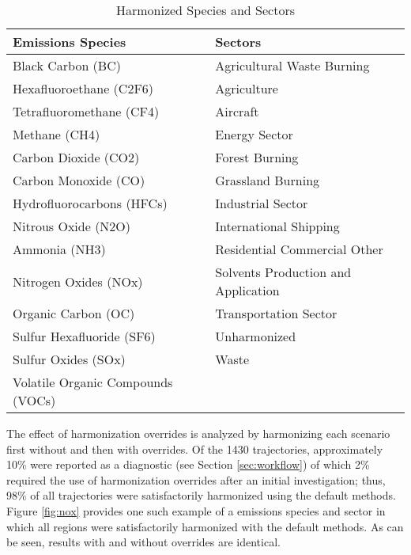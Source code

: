 \begin{table}[]
  \centering
  \caption{Harmonized Species and Sectors}
  \label{tab:sp}
  \begin{tabular}{|l|l|}
    \hline
    \textbf{Emissions Species}        & \textbf{Sectors}                    \\
    \hline
    Black Carbon (BC)                 & Agricultural Waste Burning          \\
    Hexafluoroethane (C2F6)           & Agriculture                         \\
    Tetrafluoromethane (CF4)          & Aircraft                            \\
    Methane (CH4)                     & Energy Sector                       \\
    Carbon Dioxide (CO2)              & Forest Burning                      \\
    Carbon Monoxide (CO)              & Grassland Burning                   \\
    Hydrofluorocarbons (HFCs)         & Industrial Sector                   \\
    Nitrous Oxide (N2O)               & International Shipping              \\
    Ammonia (NH3)                     & Residential Commercial Other        \\
    Nitrogen Oxides (NOx)             & Solvents Production and Application \\
    Organic Carbon (OC)               & Transportation Sector               \\
    Sulfur Hexafluoride (SF6)         & Unharmonized                        \\
    Sulfur Oxides (SOx)               & Waste                               \\
    Volatile Organic Compounds (VOCs) &                                     \\
    \hline
  \end{tabular}
\end{table}

The effect of harmonization overrides is analyzed by harmonizing each scenario
first without and then with overrides. Of the 1430 trajectories, approximately
10\% were reported as a diagnostic (see Section \ref{sec:workflow}) of which 2\%
required the use of harmonization overrides after an initial investigation;
thus, 98\% of all trajectories were satisfactorily harmonized using the default
methods. Figure \ref{fig:nox} provides
one such example of a emissions species and sector in which all regions were
satisfactorily harmonized with the default methods. As can be seen, results with
and without overrides are identical.

